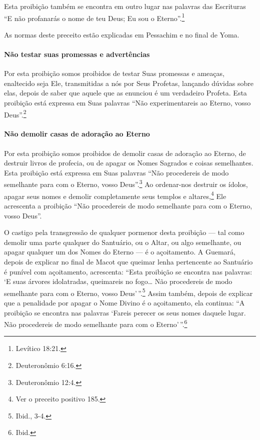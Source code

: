 Esta proibição também se encontra em outro lugar nas palavras das
Escrituras ``E não profanarás o nome de teu Deus; Eu sou o Eterno''.\footnote{Levítico 18:21.}

As normas deste preceito estão explicadas em Pessachim e no final de Yoma.

\paragraph{Não testar suas promessas e advertências}

Por esta proibição somos proibidos de testar Suas promessas e ameaças,
enaltecido seja Ele, transmitidas a nós por Seus Profetas, lançando
dúvidas sobre elas, depois de saber que aquele que as enunciou é um
verdadeiro Profeta. Esta proibição está expressa em Suas palavras ``Não
experimentareis ao Eterno, vosso Deus''.\footnote{Deuteronômio 6:16.}

\paragraph{Não demolir casas de adoração ao Eterno}

Por esta proibição somos proibidos de demolir casas de adoração ao
Eterno, de destruir livros de profecia, ou de apagar os Nomes Sagrados e
coisas semelhantes. Esta proibição está expressa em Suas palavras ``Não
procedereis de modo semelhante para com o Eterno, vosso Deus''.\footnote{Deuteronômio 12:4.} Ao ordenar-nos destruir os ídolos, apagar seus
nomes e demolir completamente seus templos e
altares,\footnote{Ver o preceito positivo 185.} Ele acrescenta a proibição ``Não
procedereis de modo semelhante para com o Eterno, vosso Deus''.

O castigo pela transgressão de qualquer pormenor desta proibição --- tal
como demolir uma parte qualquer do Santuário, ou o Altar, ou algo
semelhante, ou apagar qualquer um dos Nomes do Eterno --- é o
açoitamento. A Guemará, depois de explicar no final de Macot que queimar
lenha pertencente ao Santuário é punível com açoitamento, acrescenta:
``Esta proibição se encontra nas palavras: `E suas árvores idolatradas,
queimareis no fogo\ldots{} Não procedereis de modo semelhante para com o
Eterno, vosso Deus'\,''.\footnote{Ibid., 3-4.} Assim também, depois de explicar
que a penalidade por apagar o Nome Divino é o açoitamento, ela continua:
``A proibição se encontra nas palavras `Fareis perecer os seus nomes
daquele lugar. Não procedereis de modo semelhante para com o Eterno'\,''.\footnote{Ibid.}

